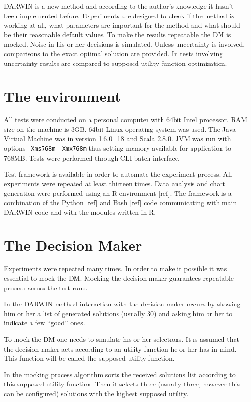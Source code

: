 DARWIN is a new method and according to the author's knowledge it hasn't been
implemented before. Experiments are designed to check if the method is working
at all, what parameters are important for the method and what should be their
reasonable default values. To make the results repeatable the DM is
mocked. Noise in his or her decisions is simulated. Unless uncertainty is
involved, comparisons to the exact optimal solution are provided. In tests
involving uncertainty results are compared to supposed utility function
optimization.

\section{The environment}

All tests were conducted on a personal computer with 64bit Intel
processor. RAM size on the machine is 3GB. 64bit Linux operating system was
used. The Java Virtual Machine was in version 1.6.0\_18 and Scala 2.8.0. JVM
was run with options \texttt{-Xms768m -Xmx768m} thus setting memory available
for application to 768MB. Tests were performed through CLI batch interface.

Test framework is available in order to automate the experiment process. All
experiments were repeated at least thirteen times. Data analysis and chart
generation were performed using an R environment [ref]. The framework is a
combination of the Python [ref] and Bash [ref] code communicating with main
DARWIN code and with the modules written in R.

\section{The Decision Maker}

Experiments were repeated many times. In order to make it possible it was
essential to mock the DM. Mocking the decision maker guarantees repeatable
process across the test runs.

In the DARWIN method interaction with the decision maker occurs by showing him
or her a list of generated solutions (usually 30) and asking him or her to
indicate a few ``good'' ones.

To mock the DM one needs to simulate his or her selections. It is assumed that
the decision maker acts according to an utility function he or her has in
mind. This function will be called the supposed utility function.

In the mocking process algorithm sorts the received solutions list according
to this supposed utility function. Then it selects three (usually three,
however this can be configured) solutions with the highest supposed utility.

